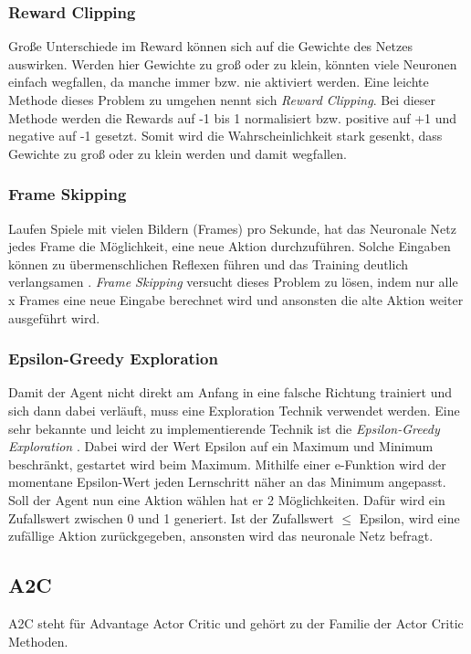 \documentclass[12pt,a4paper]{article}
\begin{document}

\subsubsection{Reward Clipping}
Große Unterschiede im Reward können sich auf die Gewichte des Netzes auswirken.
Werden hier Gewichte zu groß oder zu klein, könnten viele Neuronen einfach wegfallen, da manche immer bzw. nie aktiviert werden.
Eine leichte Methode dieses Problem zu umgehen nennt sich \textit{Reward Clipping}.
Bei dieser Methode werden die Rewards auf -1 bis 1 normalisiert bzw. positive auf +1 und negative auf -1 gesetzt.
Somit wird die Wahrscheinlichkeit stark gesenkt, dass Gewichte zu groß oder zu klein werden und damit wegfallen.

\subsubsection{Frame Skipping}
Laufen Spiele mit vielen Bildern (Frames) pro Sekunde, hat das Neuronale Netz jedes Frame die Möglichkeit, eine neue Aktion durchzuführen.
Solche Eingaben können zu übermenschlichen Reflexen führen und das Training deutlich verlangsamen \cite{braylan:2015}.
\textit{Frame Skipping} versucht dieses Problem zu lösen, indem nur alle x Frames eine neue Eingabe berechnet wird und ansonsten die alte Aktion weiter ausgeführt wird.

\subsubsection{Epsilon-Greedy Exploration}
Damit der Agent nicht direkt am Anfang in eine falsche Richtung trainiert und sich dann dabei verläuft, muss eine Exploration Technik verwendet werden.
Eine sehr bekannte und leicht zu implementierende Technik ist die \textit{Epsilon-Greedy Exploration} \cite[p. 3]{mnih:2013}.
Dabei wird der Wert Epsilon auf ein Maximum und Minimum beschränkt, gestartet wird beim Maximum.
Mithilfe einer e-Funktion wird der momentane Epsilon-Wert jeden Lernschritt näher an das Minimum angepasst.
Soll der Agent nun eine Aktion wählen hat er 2 Möglichkeiten.
Dafür wird ein Zufallswert zwischen 0 und 1 generiert.
Ist der Zufallswert $\leq$ Epsilon, wird eine zufällige Aktion zurückgegeben, ansonsten wird das neuronale Netz befragt.

\newpage

\subsection{A2C}
A2C steht für Advantage Actor Critic und gehört zu der Familie der Actor Critic Methoden.
\end{document}
